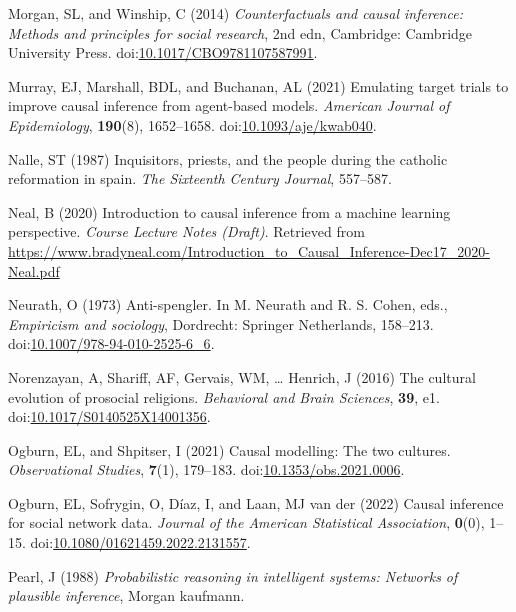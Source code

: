 \documentclass[
  single column]{article}
\newlength{\cslhangindent}
\newenvironment{CSLReferences}[2] %
 {\begin{list}{}{%
  \setlength{\itemindent}{0pt}
  \setlength{\leftmargin}{0pt}
  \setlength{\parsep}{0pt}
  \ifodd #1
   \setlength{\leftmargin}{\cslhangindent}
   \setlength{\itemindent}{-1\cslhangindent}
  \fi
  \setlength{\itemsep}{#2\baselineskip}}}
 {\end{list}}
\begin{document}
\begin{CSLReferences}{1}{0}
Morgan, SL, and Winship, C (2014) \emph{Counterfactuals and causal
inference: Methods and principles for social research}, 2nd edn,
Cambridge: Cambridge University Press.
doi:\href{https://doi.org/10.1017/CBO9781107587991}{10.1017/CBO9781107587991}.

Murray, EJ, Marshall, BDL, and Buchanan, AL (2021) Emulating target
trials to improve causal inference from agent-based models.
\emph{American Journal of Epidemiology}, \textbf{190}(8), 1652--1658.
doi:\href{https://doi.org/10.1093/aje/kwab040}{10.1093/aje/kwab040}.

Nalle, ST (1987) Inquisitors, priests, and the people during the
catholic reformation in spain. \emph{The Sixteenth Century Journal},
557--587.

Neal, B (2020) Introduction to causal inference from a machine learning
perspective. \emph{Course Lecture Notes (Draft)}. Retrieved from
\url{https://www.bradyneal.com/Introduction_to_Causal_Inference-Dec17_2020-Neal.pdf}

Neurath, O (1973) Anti-spengler. In M. Neurath and R. S. Cohen, eds.,
\emph{Empiricism and sociology}, Dordrecht: Springer Netherlands,
158--213.
doi:\href{https://doi.org/10.1007/978-94-010-2525-6_6}{10.1007/978-94-010-2525-6\_6}.

Norenzayan, A, Shariff, AF, Gervais, WM, \ldots{} Henrich, J (2016) The
cultural evolution of prosocial religions. \emph{Behavioral and Brain
Sciences}, \textbf{39}, e1.
doi:\href{https://doi.org/10.1017/S0140525X14001356}{10.1017/S0140525X14001356}.

Ogburn, EL, and Shpitser, I (2021) Causal modelling: The two cultures.
\emph{Observational Studies}, \textbf{7}(1), 179--183.
doi:\href{https://doi.org/10.1353/obs.2021.0006}{10.1353/obs.2021.0006}.

Ogburn, EL, Sofrygin, O, Díaz, I, and Laan, MJ van der (2022) Causal
inference for social network data. \emph{Journal of the American
Statistical Association}, \textbf{0}(0), 1--15.
doi:\href{https://doi.org/10.1080/01621459.2022.2131557}{10.1080/01621459.2022.2131557}.

Pearl, J (1988) \emph{Probabilistic reasoning in intelligent systems:
Networks of plausible inference}, Morgan kaufmann.


\end{CSLReferences}
\end{document}
